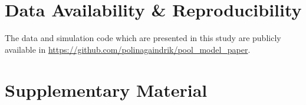 \documentclass[10pt,A4paper]{article}
\numberwithin{equation}{section}
\newcommand{\beginsupplement}{%
  \renewcommand{\thesection}{}
  \setcounter{subsection}{0}
  \renewcommand{\thesubsection}{S\arabic{subsection}}
  \setcounter{table}{0}
  \renewcommand{\thetable}{S\arabic{table}}%
  \setcounter{figure}{0}
  \renewcommand{\thefigure}{S\arabic{figure}}%
  \setcounter{listing}{0}
  \renewcommand{\thelisting}{S\arabic{listing}}
}
\begin{document}
\onecolumn

\newpage
\section*{Data Availability \& Reproducibility}

The data and simulation code which are presented in this study are publicly available in
\url{https://github.com/polinagaindrik/pool_model_paper}.

\printbibliography

\newpage
\beginsupplement
\section{Supplementary Material}
\end{document}
